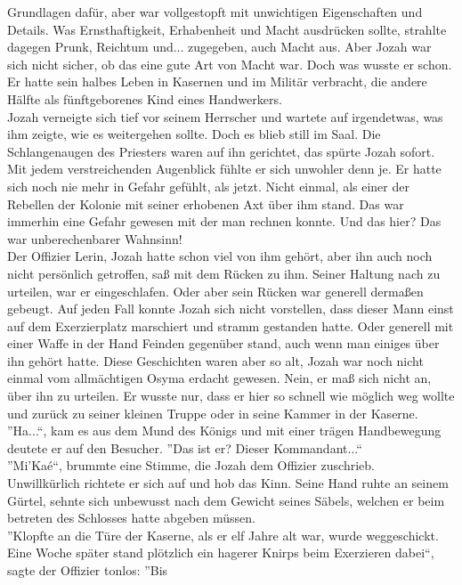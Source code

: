 Grundlagen dafür, aber war vollgestopft mit unwichtigen Eigenschaften und Details. Was 
Ernsthaftigkeit, Erhabenheit und Macht ausdrücken sollte, strahlte dagegen Prunk, Reichtum und... 
zugegeben, auch Macht aus. Aber Jozah war sich nicht sicher, ob das eine gute Art von Macht war. 
Doch was wusste er schon. Er hatte sein halbes Leben in Kasernen und im Militär verbracht, die 
andere Hälfte als fünftgeborenes Kind eines Handwerkers.\\
Jozah verneigte sich tief vor seinem Herrscher und wartete auf irgendetwas, was ihm zeigte, wie es 
weitergehen sollte.
Doch es blieb still im Saal. Die Schlangenaugen des Priesters waren auf ihn gerichtet, das spürte 
Jozah sofort. Mit jedem verstreichenden Augenblick fühlte er sich unwohler denn je. Er hatte sich 
noch nie mehr in Gefahr gefühlt, als jetzt. Nicht einmal, als einer der Rebellen der Kolonie mit 
seiner erhobenen Axt über ihm stand. Das war immerhin eine Gefahr gewesen mit der man rechnen 
konnte. Und das hier? Das war unberechenbarer Wahnsinn!\\
Der Offizier Lerin, Jozah hatte schon viel von ihm gehört, aber ihn auch noch nicht persönlich 
getroffen, saß mit dem Rücken zu ihm. Seiner Haltung nach zu urteilen, war er eingeschlafen. Oder 
aber sein Rücken war generell dermaßen gebeugt. Auf jeden Fall konnte Jozah sich nicht vorstellen, 
dass dieser Mann einst auf dem Exerzierplatz marschiert und stramm gestanden hatte. Oder generell 
mit einer Waffe in der Hand Feinden gegenüber stand, auch wenn man einiges über ihn gehört 
hatte. Diese Geschichten waren aber so alt, Jozah war noch nicht einmal vom allmächtigen Osyma 
erdacht gewesen. Nein, er maß sich nicht an, über ihn zu urteilen. Er wusste nur, dass er hier so 
schnell wie möglich weg wollte und zurück zu seiner kleinen Truppe oder in seine Kammer in der 
Kaserne.\\
''Ha...``, kam es aus dem Mund des Königs und mit einer trägen Handbewegung deutete er auf den 
Besucher. ''Das ist er? Dieser Kommandant...``\\
''Mi'Kaé``, brummte eine Stimme, die Jozah dem Offizier zuschrieb. \\
Unwillkürlich richtete er sich auf und hob das Kinn. Seine Hand ruhte an seinem Gürtel, sehnte sich 
unbewusst nach dem Gewicht seines Säbels, welchen er beim betreten des Schlosses hatte abgeben 
müssen.\\
''Klopfte an die Türe der Kaserne, als er elf Jahre alt war, wurde weggeschickt. Eine Woche später 
stand plötzlich ein hagerer Knirps beim Exerzieren dabei``, sagte der Offizier tonlos: ''Bis 
